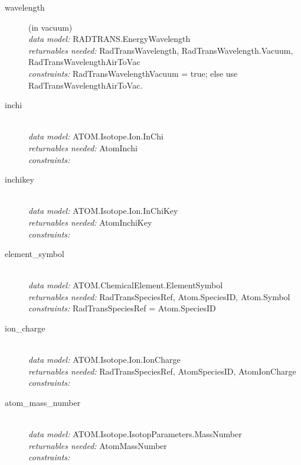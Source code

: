 \documentclass[11pt,a4paper]{ivoa}
\begin{document}
\renewcommand{\descriptionlabel}[1]{\hspace{\labelsep}\texttt{#1}}
\begin{description}

\item [wavelength] (in vacuum)\hfill\\
    \textit{data model:} RADTRANS.EnergyWavelength\\
	\textit{returnables needed:} RadTransWavelength, RadTransWavelength.Vacuum, RadTransWavelengthAirToVac\\
	\textit{constraints:} RadTransWavelengthVacuum = true; else use RadTransWavelengthAirToVac.\\

	\item [inchi] \hfill\\
	\textit{data model:} ATOM.Isotope.Ion.InChi\\
    \textit{returnables needed:} AtomInchi\\
	\textit{constraints:} \\

	\item [inchikey] \hfill\\
	\textit{data model:} ATOM.Isotope.Ion.InChiKey\\
    \textit{returnables needed:} AtomInchiKey\\
    \textit{constraints:} \\

\item [element\_symbol] \hfill\\
	\textit{data model:} ATOM.ChemicalElement.ElementSymbol\\
	\textit{returnables needed:} RadTransSpeciesRef, Atom.SpeciesID, Atom.Symbol
	\textit{constraints:}  RadTransSpeciesRef = Atom.SpeciesID

\item [ion\_charge]\hfill\\
	\textit{data model:} ATOM.Isotope.Ion.IonCharge\\
	\textit{returnables needed:} RadTransSpeciesRef, AtomSpeciesID, AtomIonCharge\\
	\textit{constraints:}

	\item [atom\_mass\_number]\hfill\\
	\textit{data model:} ATOM.Isotope.IsotopParameters.MassNumber\\
	\textit{returnables needed:} AtomMassNumber\\
	\textit{constraints:}


\end{description}
\end{document}
